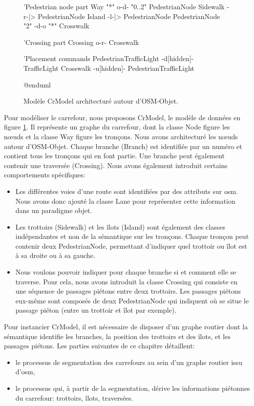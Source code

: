 \begin{figure}[ht]
\begin{plantuml}
        'Pedestrian node part
        Way "*" o-d- "0..2" PedestrianNode
        Sidewalk -r-|> PedestrianNode
        Island -l-|> PedestrianNode
        PedestrianNode "2" -d-o "*" Crosswalk

        'Crossing part
        Crossing o-r- Crosswalk

        'Placement commands
        PedestrianTrafficLight -d[hidden]- TrafficLight
        Crosswalk -u[hidden]- PedestrianTrafficLight

        @enduml 
    \end{plantuml}
    \caption[Modèle CrModel.]{Modèle CrModel architecturé autour d'OSM-Objet.}
    \label{fig:modelisation_crmodel}
\end{figure}

Pour modéliser le carrefour, nous proposons CrModel, le modèle de données en figure \ref{fig:modelisation_crmodel}. Il représente un graphe du carrefour, dont la classe Node figure les nœuds et la classe Way figure les tronçons. Nous avons architecturé les nœuds autour d'OSM-Objet. Chaque branche (Branch) est identifiée par un numéro et contient tous les tronçons qui en font partie. Une  branche peut également contenir une traversée (Crossing). Nous avons également introduit certains comportements spécifiques:

\begin{itemize}
    \item Les différentes voies d'une route sont identifiées par des attributs sur \gls{osm}. Nous avons donc ajouté la classe Lane pour représenter cette information dans un paradigme objet.
    \item Les trottoirs (Sidewalk) et les îlots (Island) sont également des classes indépendantes et non de la sémantique sur les tronçons. Chaque tronçon peut contenir deux PedestrianNode, permettant d'indiquer quel trottoir ou îlot est à sa droite ou à sa gauche.
    \item Nous voulons pouvoir indiquer pour chaque branche si et comment elle se traverse. Pour cela, nous avons introduit la classe Crossing qui consiste en une séquence de passages piétons entre deux trottoirs. Les passages piétons eux-même sont composés de deux PedestrianNode qui indiquent où se situe le passage piéton (entre un trottoir et îlot par exemple).
\end{itemize}

\newpar{}

Pour instancier CrModel, il est nécessaire de disposer d'un graphe routier dont la sémantique identifie les branches, la position des trottoirs et des îlots, et les passages piétons. Les parties suivantes de ce chapitre détaillent:
\begin{itemize}
    \item le processus de segmentation des carrefours au sein d'un graphe routier issu d'\gls{osm},
    \item le processus qui, à partir de la segmentation, dérive les informations piétonnes du carrefour: trottoirs, îlots, traversées.
\end{itemize}

